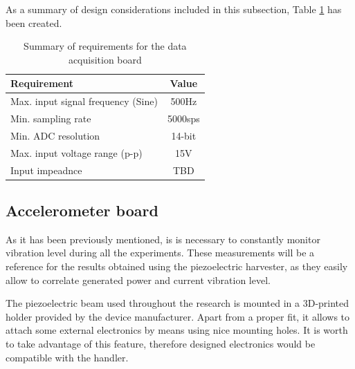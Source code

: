 \documentclass[12pt,a4paper]{article}
\begin{document}
As a summary of design considerations included in this subsection, Table \ref{tab:requirements} has been created.
\begin{table}[ht!]
\begin{tabular}{|l|c|}
\hline
\textbf{Requirement}              & \textbf{Value} \\ \hline
Max. input signal frequency (Sine) & 500Hz          \\ \hline
Min. sampling rate                 & 5000sps        \\ \hline
Min. ADC resolution                & 14-bit         \\ \hline
Max. input voltage range (p-p)     & 15V            \\ \hline
Input impeadnce                    & TBD            \\ \hline
\end{tabular}
\caption{Summary of requirements for the data acquisition board}
\label{tab:requirements}
\end{table}
\par

\subsection{Accelerometer board}
As it has been previously mentioned, is is necessary to constantly monitor vibration level during all the experiments. These measurements will be a reference for the results obtained using the piezoelectric harvester, as they easily allow to correlate generated power and current vibration level.
\par

The piezoelectric beam used throughout the research is mounted in a 3D-printed holder provided by the device manufacturer. Apart from a proper fit, it allows to attach some external electronics by means using nice mounting holes. It is worth to take advantage of this feature, therefore designed electronics would be compatible with the handler.
\par
\end{document}
